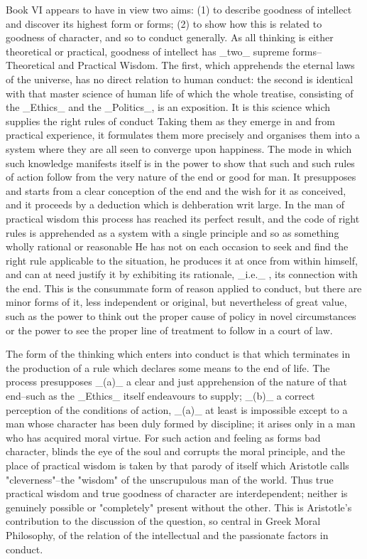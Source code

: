 Book VI appears to have in view two aims: (1) to describe goodness of
intellect and discover its highest form or forms; (2) to show how this
is related to goodness of character, and so to conduct generally. As all
thinking is either theoretical or practical, goodness of intellect has
_two_ supreme forms--Theoretical and Practical Wisdom. The first, which
apprehends the eternal laws of the universe, has no direct relation to
human conduct: the second is identical with that master science of human
life of which the whole treatise, consisting of the _Ethics_ and the
_Politics_, is an exposition. It is this science which supplies the
right rules of conduct Taking them as they emerge in and from practical
experience, it formulates them more precisely and organises them into a
system where they are all seen to converge upon happiness. The mode in
which such knowledge manifests itself is in the power to show that such
and such rules of action follow from the very nature of the end or good
for man. It presupposes and starts from a clear conception of the end
and the wish for it as conceived, and it proceeds by a deduction which
is dehberation writ large. In the man of practical wisdom this process
has reached its perfect result, and the code of right rules is
apprehended as a system with a single principle and so as something
wholly rational or reasonable He has not on each occasion to seek and
find the right rule applicable to the situation, he produces it at
once from within himself, and can at need justify it by exhibiting its
rationale, _i.e._ , its connection with the end. This is the consummate
form of reason applied to conduct, but there are minor forms of it, less
independent or original, but nevertheless of great value, such as the
power to think out the proper cause of policy in novel circumstances or
the power to see the proper line of treatment to follow in a court of
law.

The form of the thinking which enters into conduct is that which
terminates in the production of a rule which declares some means to the
end of life. The process presupposes _(a)_ a clear and just apprehension
of the nature of that end--such as the _Ethics_ itself endeavours to
supply; _(b)_ a correct perception of the conditions of action, _(a)_ at
least is impossible except to a man whose character has been duly formed
by discipline; it arises only in a man who has acquired moral virtue.
For such action and feeling as forms bad character, blinds the eye of
the soul and corrupts the moral principle, and the place of practical
wisdom is taken by that parody of itself which Aristotle calls
"cleverness"--the "wisdom" of the unscrupulous man of the world. Thus
true practical wisdom and true goodness of character are interdependent;
neither is genuinely possible or "completely" present without the other.
This is Aristotle's contribution to the discussion of the question, so
central in Greek Moral Philosophy, of the relation of the intellectual
and the passionate factors in conduct.

